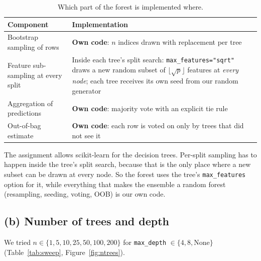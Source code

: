 \documentclass[11pt]{article}
\begin{document}
\begin{table}[H]\centering\small
\caption{Which part of the forest is implemented where.}\label{tab:rfparts}
\begin{tabular}{@{}lp{10.2cm}@{}}
\toprule
Component & Implementation \\
\midrule
Bootstrap sampling of rows & \textbf{Own code}: $n$ indices drawn with replacement per tree \\
Feature sub-sampling at every split & Inside each tree's split search: \texttt{max\_features="sqrt"} draws a new random subset of $\lfloor\sqrt{p}\rfloor$ features at \emph{every node}; each tree receives its own seed from our random generator \\
Aggregation of predictions & \textbf{Own code}: majority vote with an explicit tie rule \\
Out-of-bag estimate & \textbf{Own code}: each row is voted on only by trees that did not see it \\
\bottomrule
\end{tabular}
\end{table}
The assignment allows scikit-learn for the decision trees. Per-split sampling has to happen inside the
tree's split search, because that is the only place where a new subset can be drawn at every node. So
the forest uses the tree's \texttt{max\_features} option for it, while everything that makes the
ensemble a random forest (resampling, seeding, voting, OOB) is our own code.

\subsection{(b) Number of trees and depth}
We tried $n\in\{1,5,10,25,50,100,200\}$ for \texttt{max\_depth} $\in\{4, 8, \text{None}\}$
(Table~\ref{tab:sweep}, Figure~\ref{fig:ntrees}).
\end{document}
